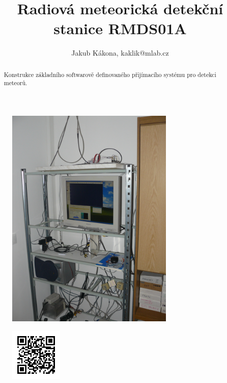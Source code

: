 \documentclass[12pt,a4paper,oneside]{article}
\begin{document}
\title{Radiová meteorická detekční stanice RMDS01A}
\author{Jakub Kákona, kaklik@mlab.cz }
\maketitle

\begin{abstract}
Konstrukce základního softwarově definovaného přijímacího systému pro detekci meteorů.
\end{abstract}

\begin{figure} [htbp]
\begin{center}
\includegraphics [width=80mm] {./img/meteor_detector_station.JPG} 
\end{center}
\end{figure}

\begin{figure} [b]
\includegraphics [width=25mm] {./img/SDRX01B_QRcode.png} 
\end{figure}

\newpage
\tableofcontents
\end{document}
